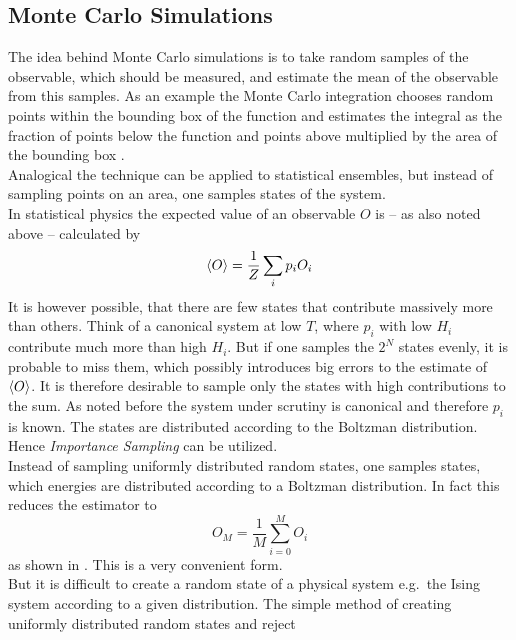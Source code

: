 \subsection{Monte Carlo Simulations}
\label{ssec:montecarlo}
    The idea behind Monte Carlo simulations is to take random samples of
    the observable, which should be measured, and estimate the mean of the observable from
    this samples. As an example the Monte Carlo integration chooses random
    points within the bounding box of the function and estimates the integral
    as the fraction of points below the function and points above multiplied
    by the area of the bounding box \cite{Katzgraber2011}.\\
    Analogical the technique can be applied to statistical ensembles,
    but instead of sampling points on an area, one samples states of the
    system.\\
    In statistical physics the expected value of an observable \(O\)
    is -- as also noted above -- calculated by
    \begin{equation}
        \left< O \right> = \frac{1}{Z} \sum_i p_i O_i
    \end{equation}
    It is however possible, that there are few states that contribute
    massively more than others. Think of a canonical system at low \(T\),
    where \(p_i\) with low \(H_i\) contribute much more than high \(H_i\).
    But if one samples the \(2^N\) states evenly, it is probable to miss
    them, which possibly introduces big errors to the estimate of \(\left< O \right>\).
    It is therefore desirable to sample only the states with high
    contributions to the sum.
    As noted before the system under scrutiny is canonical and therefore
    \(p_i\) is known. The states are distributed according to the Boltzman
    distribution. Hence \emph{Importance Sampling} can be utilized.\\
    Instead of sampling uniformly distributed random states, one samples
    states, which energies are distributed according to a Boltzman distribution.
    In fact this reduces the estimator to
    \begin{equation}
        O_M = \frac{1}{M} \sum_{i=0}^M O_i
    \end{equation}
    as shown in \cite{NewmanBarkema1999}. This is a very convenient form.\\
    But it is difficult to create a random state of a physical system
    e.g.\ the Ising system according to a given distribution. The simple
    method of creating uniformly distributed random states and reject
